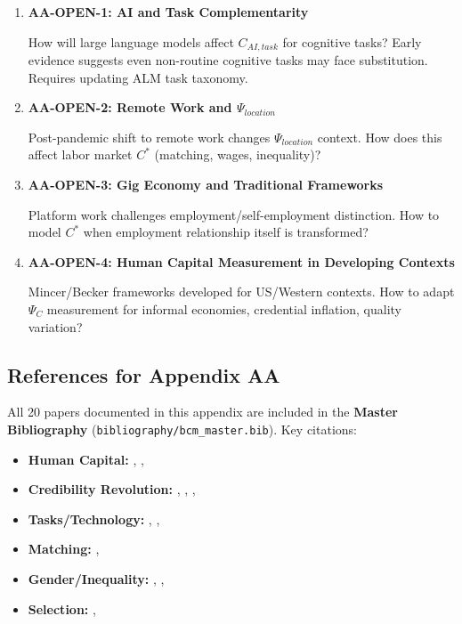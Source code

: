 \begin{enumerate}
    \item \textbf{AA-OPEN-1: AI and Task Complementarity}

    How will large language models affect $C_{AI, task}$ for cognitive tasks? Early evidence suggests even non-routine cognitive tasks may face substitution. Requires updating ALM task taxonomy.

    \item \textbf{AA-OPEN-2: Remote Work and $\Psi_{location}$}

    Post-pandemic shift to remote work changes $\Psi_{location}$ context. How does this affect labor market $C^*$ (matching, wages, inequality)?

    \item \textbf{AA-OPEN-3: Gig Economy and Traditional Frameworks}

    Platform work challenges employment/self-employment distinction. How to model $C^*$ when employment relationship itself is transformed?

    \item \textbf{AA-OPEN-4: Human Capital Measurement in Developing Contexts}

    Mincer/Becker frameworks developed for US/Western contexts. How to adapt $\Psi_C$ measurement for informal economies, credential inflation, quality variation?
\end{enumerate}

\subsection{References for Appendix AA}
\label{sec:aa-references}

All 20 papers documented in this appendix are included in the \textbf{Master Bibliography}
(\texttt{bibliography/bcm\_master.bib}). Key citations:

\begin{itemize}[noitemsep]
    \item \textbf{Human Capital:} \cite{becker1962}, \cite{mincer1974}, \cite{arrow1962lbd}
    \item \textbf{Credibility Revolution:} \cite{cardkrueger1994}, \cite{card1990}, \cite{angristkrueger1991}, \cite{imbensangrist1994}
    \item \textbf{Tasks/Technology:} \cite{alm2003}, \cite{acemogluautor2011}, \cite{autor2008}
    \item \textbf{Matching:} \cite{diamond1982}, \cite{mortensenpissarides1994}
    \item \textbf{Gender/Inequality:} \cite{goldin2014}, \cite{goldinkatz2008}, \cite{katzmurphy1992}
    \item \textbf{Selection:} \cite{heckman1979}, \cite{heckman2006}
\end{itemize}

